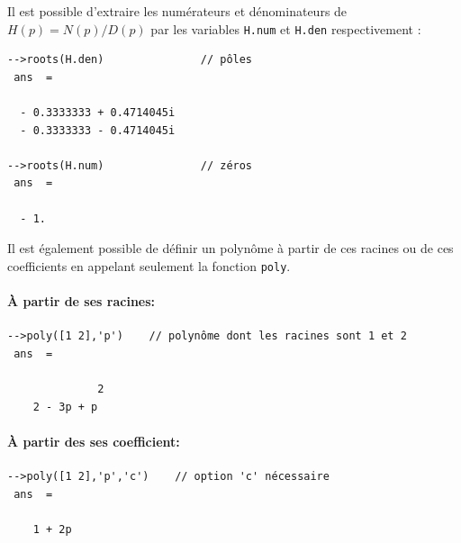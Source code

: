Il est possible d'extraire les numérateurs et dénominateurs de $H(p)=N(p)/D(p)$ 
par les variables \verb?H.num? et \verb?H.den? respectivement :
\begin{code}
\begin{verbatim}
-->roots(H.den)               // pôles
 ans  =
 
  - 0.3333333 + 0.4714045i  
  - 0.3333333 - 0.4714045i

-->roots(H.num)               // zéros
 ans  =
 
  - 1.
\end{verbatim}
\end{code}

Il est également possible de définir un polynôme à partir de ces racines ou de ces coefficients 
en appelant seulement la fonction \verb?poly?.

\paragraph{\`A partir de ses racines:}

\begin{code}                                                                                                                  
\begin{verbatim}
-->poly([1 2],'p')    // polynôme dont les racines sont 1 et 2
 ans  =
 
              2  
    2 - 3p + p   
\end{verbatim}                                                                                                                
\end{code}      

\paragraph{\`A partir des ses coefficient:}

\begin{code}                                                                                                                  
\begin{verbatim}
-->poly([1 2],'p','c')    // option 'c' nécessaire
 ans  =
 
    1 + 2p   
\end{verbatim}                                                                                                                
\end{code}     

